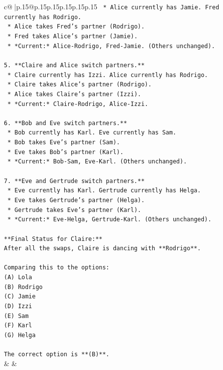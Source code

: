 \documentclass{article}
\begin{document}
{\begin{supertabular}{c@{$\;$}|p{.15\linewidth}@{}p{.15\linewidth}p{.15\linewidth}p{.15\linewidth}p{.15\linewidth}p{.15\linewidth}}
{{{\texttt{    *   Alice currently has Jamie. Fred currently has Rodrigo.} \\
\texttt{    *   Alice takes Fred's partner (Rodrigo).} \\
\texttt{    *   Fred takes Alice's partner (Jamie).} \\
\texttt{    *   *Current:* Alice{-}Rodrigo, Fred{-}Jamie. (Others unchanged).} \\
\\ 
\texttt{5.  **Claire and Alice switch partners.**} \\
\texttt{    *   Claire currently has Izzi. Alice currently has Rodrigo.} \\
\texttt{    *   Claire takes Alice's partner (Rodrigo).} \\
\texttt{    *   Alice takes Claire's partner (Izzi).} \\
\texttt{    *   *Current:* Claire{-}Rodrigo, Alice{-}Izzi.} \\
\\ 
\texttt{6.  **Bob and Eve switch partners.**} \\
\texttt{    *   Bob currently has Karl. Eve currently has Sam.} \\
\texttt{    *   Bob takes Eve's partner (Sam).} \\
\texttt{    *   Eve takes Bob's partner (Karl).} \\
\texttt{    *   *Current:* Bob{-}Sam, Eve{-}Karl. (Others unchanged).} \\
\\ 
\texttt{7.  **Eve and Gertrude switch partners.**} \\
\texttt{    *   Eve currently has Karl. Gertrude currently has Helga.} \\
\texttt{    *   Eve takes Gertrude's partner (Helga).} \\
\texttt{    *   Gertrude takes Eve's partner (Karl).} \\
\texttt{    *   *Current:* Eve{-}Helga, Gertrude{-}Karl. (Others unchanged).} \\
\\ 
\texttt{**Final Status for Claire:**} \\
\texttt{After all the swaps, Claire is dancing with **Rodrigo**.} \\
\\ 
\texttt{Comparing this to the options:} \\
\texttt{(A) Lola} \\
\texttt{(B) Rodrigo} \\
\texttt{(C) Jamie} \\
\texttt{(D) Izzi} \\
\texttt{(E) Sam} \\
\texttt{(F) Karl} \\
\texttt{(G) Helga} \\
\\ 
\texttt{The correct option is **(B)**.} \\
            }
        }
    }
    & & \\ \\


\end{supertabular}}
\end{document}
